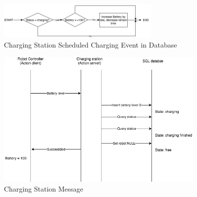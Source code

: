 \begin{figure}
 \centering
 \includegraphics[width = 0.7\textwidth]{content/images/ch4/charging_station_charging_event.drawio.png}
 \caption{Charging Station Scheduled Charging Event in Database}
 \label{fig:charging_station_event}
\end{figure}

\begin{figure}
 \centering
 \includegraphics[width = 0.9\textwidth]{content/images/ch4/charging_station_message.drawio.png}
 \caption{Charging Station Message}
 \label{fig:charging_station_message}
\end{figure}

